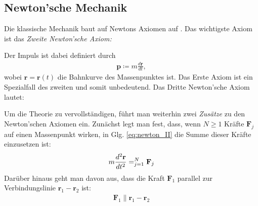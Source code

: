 \documentclass{book}
\let\sum\relax
\DeclareMathOperator*{\sum}{\raisebox{-3.5pt}{\scalebox{2}{\rotatebox{1}{{\bask Σ}}}}}
\begin{document}
\subsection{Newton'sche Mechanik}
\label{sec:newtonsche_mechanik}

Die klassische Mechanik baut auf Newtons Axiomen auf \cite{fliessbach_theo_1}. Das wichtigste Axiom ist das \textit{Zweite Newton'sche Axiom:}
%
\begin{center}
\end{center}
%
Der Impuls ist dabei definiert durch
%
\begin{eqnarray}
\mathbf{p} \coloneqq m\frac{d\mathbf{r}}{dt}, 
\end{eqnarray}
%
wobei $\mathbf{r} = \mathbf{r}\left(t\right)$ die Bahnkurve des Massenpunktes ist. Das Erste Axiom ist ein Spezialfall des zweiten und somit unbedeutend. Das Dritte Newton'sche Axiom lautet:
%
\begin{center}
\end{center}
%
Um die Theorie zu vervollständigen, führt man weiterhin zwei \textit{Zusätze} zu den Newton'schen Axiomen ein. Zunächst legt man fest, dass, wenn $N \geq 1$ Kräfte $\mathbf{F}_j$ auf einen Massenpunkt wirken, in Glg. \eqref{eq:newton_II} die Summe dieser Kräfte einzusetzen ist:
%
\begin{eqnarray}
m\frac{d^2\mathbf{r}}{dt^2} = \sum_{j = 1}^{N}\mathbf{F}_j
\end{eqnarray}
%
Darüber hinaus geht man davon aus, dass die Kraft $\mathbf{F}_1$ parallel zur Verbindungslinie $\mathbf{r}_1 - \mathbf{r}_2$ ist:
%
\begin{eqnarray}
\mathbf{F}_1 \parallel \mathbf{r}_1 - \mathbf{r}_2
\end{eqnarray}
\end{document}

